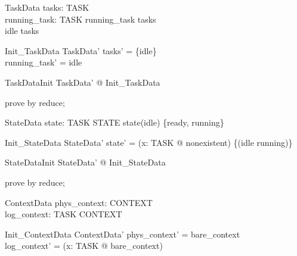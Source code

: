 \documentclass[a4paper, 12pt]{article}
\begin{document}
%
%
%
%
\begin{schema}{TaskData}
  tasks: \power  TASK\\
  running\_task: TASK
\where
  running\_task \in  tasks\\
  idle \in  tasks
\end{schema}

\begin{schema}{Init\_TaskData}
  TaskData'
\where
  tasks' = \{idle\}\\
  running\_task' = idle
\end{schema}

\begin{theorem}{TaskDataInit}
\exists  TaskData' @ Init\_TaskData
\end{theorem}

\begin{zproof}[TaskDataInit]
prove by reduce;
\end{zproof}

\begin{schema}{StateData}
  state: TASK \fun  STATE
\where
  state(idle) \in  \{ready, running\}
\end{schema}

\begin{schema}{Init\_StateData}
  StateData'
\where
  state' = (\lambda  x: TASK @ nonexistent) \oplus  \{(idle \mapsto  running)\}
\end{schema}

\begin{theorem}{StateDataInit}
\exists  StateData' @ Init\_StateData
\end{theorem}

\begin{zproof}[StateDataInit]
prove by reduce;
\end{zproof}

\begin{schema}{ContextData}
  phys\_context: CONTEXT\\
  log\_context: TASK \fun  CONTEXT
\end{schema}

\begin{schema}{Init\_ContextData}
  ContextData'
\where
  phys\_context' = bare\_context\\
  log\_context' = (\lambda  x: TASK @ bare\_context)
\end{schema}
\end{document}
